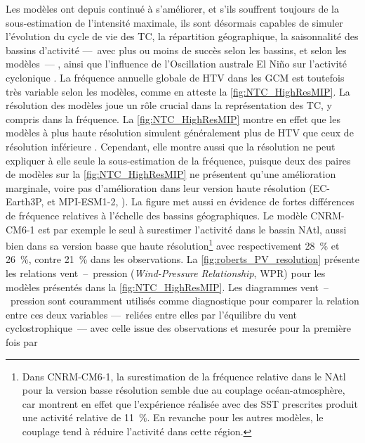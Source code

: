 \documentclass[../main.tex]{subfiles}
\begin{document}
Les modèles ont depuis continué à s'améliorer, et s'ils souffrent toujours de la sous-estimation de l'intensité maximale, ils sont désormais capables de simuler
l'évolution du cycle de vie des TC, la répartition géographique, la saisonnalité des bassins d'activité ---~avec plus ou moins de succès selon les bassins, et
selon les modèles~--- \parencite{bengtsson_tropical_2007,zhao_simulations_2009,shaevitz_characteristics_2014}, ainsi que l'influence de l'Oscillation australe
El Niño sur l'activité cyclonique \parencite{vitart_simulation_1997,gualdi_changes_2008,camargo_experimental_2009}. La fréquence annuelle globale de HTV dans
les GCM est toutefois très variable selon les modèles, comme en atteste la \cref{fig:NTC_HighResMIP}. La résolution des modèles joue un rôle crucial dans la
représentation des TC, y compris dans la fréquence. La \cref{fig:NTC_HighResMIP} montre en effet que les modèles à plus haute résolution simulent généralement
plus de HTV que ceux de résolution inférieure \parencite{camargo_global_2013,roberts_impact_2020}. Cependant, elle montre aussi que la résolution ne peut
expliquer à elle seule la sous-estimation de la fréquence, puisque deux des paires de modèles sur la \cref{fig:NTC_HighResMIP} ne présentent qu'une amélioration
marginale, voire pas d'amélioration dans leur version haute résolution (EC-Earth3P, \cite{haarsma_highresmip_2020} et MPI-ESM1-2, \cite{gutjahr_max_2019}). La
figure met aussi en évidence de fortes différences de fréquence relatives à l'échelle des bassins géographiques. Le modèle CNRM-CM6-1 est par exemple le seul à
surestimer l'activité dans le bassin NAtl, aussi bien dans sa version basse que haute résolution\footnote{Dans CNRM-CM6-1, la surestimation de la fréquence
relative dans le NAtl pour la version basse résolution semble due au couplage océan-atmosphère, car \cite{roberts_impact_2020,roberts_projected_2020}
montrent en effet que l'expérience réalisée avec des SST prescrites produit une activité relative de \SI{11}{\percent}. En revanche pour les autres modèles,
le couplage tend à réduire l'activité dans cette région.} avec respectivement \SI{28}{\percent} et \SI{26}{\percent}, contre \SI{21}{\percent} dans les
observations. La \cref{fig:roberts_PV_resolution} présente les relations vent~--~pression (\textit{Wind-Pressure Relationship}, WPR) pour les modèles présentés
dans la \cref{fig:NTC_HighResMIP}. Les diagrammes vent~--~pression sont couramment utilisés comme diagnostique pour comparer la relation entre ces deux
variables ---~reliées entre elles par l'équilibre du vent cyclostrophique~--- avec celle issue des observations et mesurée pour la première fois par
\end{document}
